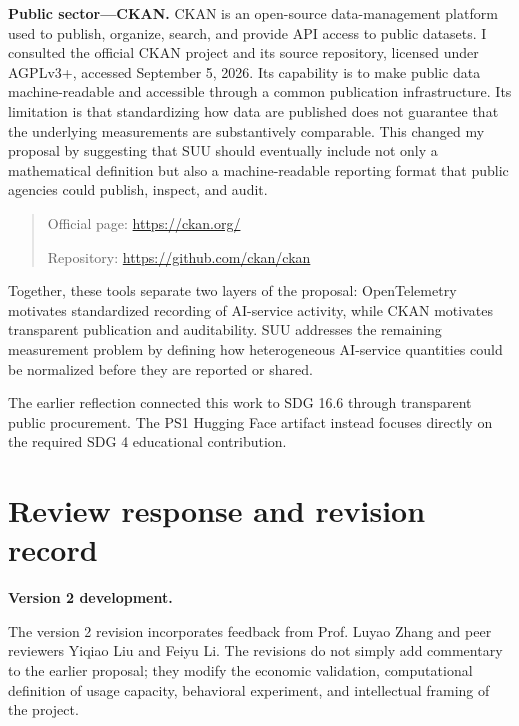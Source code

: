 \documentclass[sigconf,nonacm]{acmart}
\begin{document}
\textbf{Public sector---CKAN.}
CKAN is an open-source data-management platform used to publish, organize,
search, and provide API access to public datasets.
I consulted the official CKAN project and its source repository,
licensed under AGPLv3+, accessed September 5, 2026.
Its capability is to make public data machine-readable and accessible through
a common publication infrastructure.
Its limitation is that standardizing how data are published does not guarantee
that the underlying measurements are substantively comparable.
This changed my proposal by suggesting that SUU should eventually include not
only a mathematical definition but also a machine-readable reporting format
that public agencies could publish, inspect, and audit.

\begin{quote}
Official page:
\url{https://ckan.org/}

Repository:
\url{https://github.com/ckan/ckan}
\end{quote}

Together, these tools separate two layers of the proposal:
OpenTelemetry motivates standardized recording of AI-service activity,
while CKAN motivates transparent publication and auditability.
SUU addresses the remaining measurement problem by defining how heterogeneous
AI-service quantities could be normalized before they are reported or shared.

\vspace{0.5em}

The earlier reflection connected this work to SDG 16.6 through transparent
public procurement.
The PS1 Hugging Face artifact instead focuses directly on the required
SDG 4 educational contribution.


\clearpage
\onecolumn

\section{Review response and revision record}

\textbf{Version 2 development.}

The version 2 revision incorporates feedback from
Prof. Luyao Zhang and peer reviewers Yiqiao Liu and Feiyu Li.
The revisions do not simply add commentary to the earlier proposal;
they modify the economic validation, computational definition of usage
capacity, behavioral experiment, and intellectual framing of the project.
\end{document}
